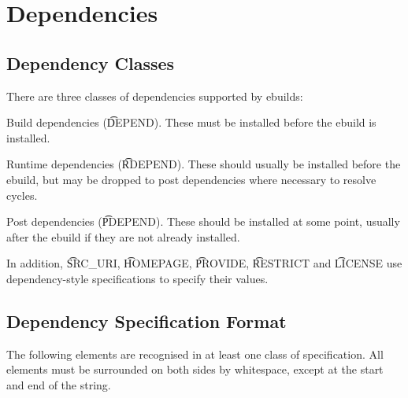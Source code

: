 \chapter{Dependencies}
\label{dependencies}

\section{Dependency Classes}

There are three classes of dependencies supported by ebuilds:

\begin{compactitem}
\item Build dependencies (\t{DEPEND}). These must be installed before the ebuild is installed.
\item Runtime dependencies (\t{RDEPEND}). These should usually be installed before the ebuild,
    but may be dropped to post dependencies where necessary to resolve cycles.
\item Post dependencies (\t{PDEPEND}). These should be installed at some point, usually after
    the ebuild if they are not already installed.
\end{compactitem}

In addition, \t{SRC\_URI}, \t{HOMEPAGE}, \t{PROVIDE}, \t{RESTRICT} and \t{LICENSE} use
dependency-style specifications to specify their values.

\section{Dependency Specification Format}

The following elements are recognised in at least one class of specification. All elements must
be surrounded on both sides by whitespace, except at the start and end of the string.

